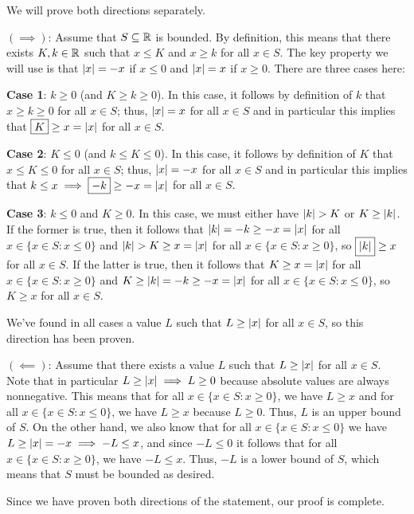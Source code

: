 \documentclass[main.tex]{subfiles}
\begin{document}
\begin{soln}
    We will prove both directions separately.
    
    $(\implies)$: Assume that $S\subseteq \mathbb R$ is bounded. By definition, this means that there exists $K, k\in \mathbb R$ such that $x\le K$ and $x \ge k$ for all $x\in S$. The key property we will use is that $\left\lvert x \right\rvert = -x$ if $x \le 0$ and $\left\lvert x \right\rvert = x$ if $x\ge 0$. There are three cases here:
    
    \textbf{Case 1}: $k \ge 0$ (and $K\ge k\ge 0$). In this case, it follows by definition of $k$ that $x\ge k\ge 0$ for all $x\in S$; thus, $\left\lvert x \right\rvert = x$ for all $x\in S$ and in particular this implies that $\boxed{K}\ge x = \left\lvert x \right\rvert$ for all $x\in S$.
    
    \textbf{Case 2}: $K \le 0$ (and $k\le K\le 0$). In this case, it follows by definition of $K$ that $x\le K\le 0$ for all $x\in S$; thus, $\left\lvert x \right\rvert = -x$ for all $x\in S$ and in particular this implies that $k\le x\implies \boxed{-k}\ge -x = \left\lvert x \right\rvert$ for all $x\in S$.
    
    \textbf{Case 3}: $k \le 0$ and $K\ge 0$. In this case, we must either have $\left\lvert k \right\rvert > K$ or $K \ge \left\lvert k \right\rvert$. If the former is true, then it follows that $\left\lvert k \right\rvert = -k \ge -x = \left\lvert x \right\rvert$ for all $x\in \{x\in S : x\le 0\}$ and $\left\lvert k \right\rvert > K \ge x = \left\lvert x \right\rvert$ for all $x\in \{x\in S : x\ge 0\}$, so $\boxed{\left\lvert k \right\rvert}\ge x$ for all $x\in S$. If the latter is true, then it follows that $K\ge x = \left\lvert x \right\rvert$ for all $x\in \{x\in S : x\ge 0\}$ and $K\ge \left\lvert k \right\rvert = -k \ge -x = \left\lvert x \right\rvert$ for all $x\in \{x\in S : x\le 0\}$, so $\boxed{K} \ge x$ for all $x\in S$.

    We've found in all cases a value $L$ such that $L\ge \left\lvert x \right\rvert$ for all $x\in S$, so this direction has been proven.

    $(\impliedby)$: Assume that there exists a value $L$ such that $L\ge \left\lvert x \right\rvert$ for all $x\in S$. Note that in particular $L\ge \left\lvert x \right\rvert\implies L\ge 0$ because absolute values are always nonnegative. This means that for all $x\in \{x\in S : x\ge 0\}$, we have $L\ge x$ and for all $x\in \{x\in S : x\le 0\}$, we have $L\ge x$ because $L\ge 0$. Thus, $L$ is an upper bound of $S$. On the other hand, we also know that for all $x\in \{x\in S : x\le 0\}$ we have $L\ge \left\lvert x \right\rvert = -x\implies -L\le x$, and since $-L\le 0$ it follows that for all $x\in \{x\in S : x\ge 0\}$, we have $-L\le x$. Thus, $-L$ is a lower bound of $S$, which means that $S$ must be bounded as desired.

    Since we have proven both directions of the statement, our proof is complete.
\end{soln}
\eject
\end{document}

